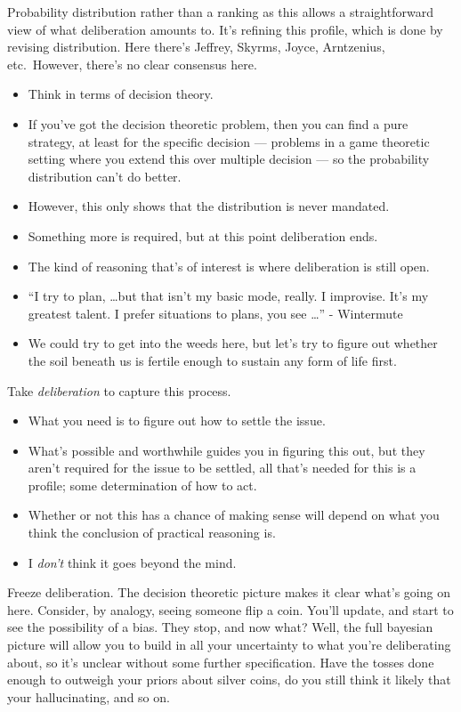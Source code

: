 \documentclass[10pt]{article}
\begin{document}
Probability distribution rather than a ranking as this allows a straightforward view of what deliberation amounts to.
It's refining this profile, which is done by revising distribution.
Here there's Jeffrey, Skyrms, Joyce, Arntzenius, etc.\
However, there's no clear consensus here.
\begin{itemize}
\item Think in terms of decision theory.
\item If you've got the decision theoretic problem, then you can find a pure strategy, at least for the specific decision --- problems in a game theoretic setting where you extend this over multiple decision --- so the probability distribution can't do better.
\item However, this only shows that the distribution is never mandated.
\item Something more is required, but at this point deliberation ends.
\item The kind of reasoning that's of interest is where deliberation is still open.
\item ``I try to plan, \dots but that isn't my basic mode, really.
  I improvise.
  It’s my greatest talent.
  I prefer situations to plans, you see \dots'' - Wintermute
\item We could try to get into the weeds here, but let's try to figure out whether the soil beneath us is fertile enough to sustain any form of life first.
\end{itemize}

Take \emph{deliberation} to capture this process.
\begin{itemize}
\item What you need is to figure out how to settle the issue.
\item What's possible and worthwhile guides you in figuring this out, but they aren't required for the issue to be settled, all that's needed for this is a profile; some determination of how to act.
\end{itemize}

\begin{itemize}
\item Whether or not this has a chance of making sense will depend on what you think the conclusion of practical reasoning is.
\item I \emph{don't} think it goes beyond the mind.
\end{itemize}

Freeze deliberation.
The decision theoretic picture makes it clear what's going on here.
Consider, by analogy, seeing someone flip a coin.
You'll update, and start to see the possibility of a bias.
They stop, and now what?
Well, the full bayesian picture will allow you to build in all your uncertainty to what you're deliberating about, so it's unclear without some further specification.
Have the tosses done enough to outweigh your priors about silver coins, do you still think it likely that your hallucinating, and so on.
\end{document}
